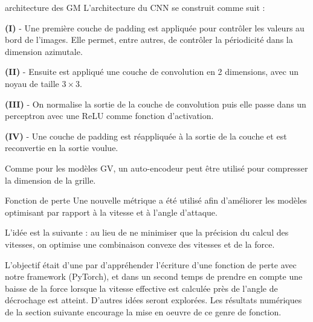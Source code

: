 \documentclass[
11pt,notheorems,hyperref={pdfauthor=whatever}
]{beamer}
\begin{document}
\begin{frame}{architecture des GM}
    L'architecture du CNN se construit comme suit : 
    
    \vspace{0.2cm}

    \textbf{(I)} - Une première couche de padding est appliquée pour contrôler les valeurs au bord de l'images. Elle permet, entre autres, de contrôler la périodicité dans la dimension azimutale.

    \vspace{0.2cm}

    \textbf{(II)} - Ensuite est appliqué une couche de convolution en 2 dimensions, avec un noyau de taille $3 \times 3$.

    \vspace{0.2cm}

    \textbf{(III)} - On normalise la sortie de la couche de convolution puis elle passe dans un perceptron avec une ReLU comme fonction d'activation.

    \vspace{0.2cm}

    \textbf{(IV)} - Une couche de padding est réappliquée à la sortie de la couche et est reconvertie en la sortie voulue.

    \vspace{0.3cm}

    Comme pour les modèles GV, un auto-encodeur peut être utilisé pour compresser la dimension de la grille.  
\end{frame}

\begin{frame}{Fonction de perte}
    Une nouvelle métrique a été utilisé afin d'améliorer les modèles optimisant
    par rapport à la vitesse et à l'angle d'attaque. 
    
    \vspace{0.2cm}

    L'idée est la suivante : au lieu de ne minimiser que la précision du calcul des vitesses, on optimise une combinaison convexe
    des vitesses et de la force. 
    
    \vspace{0.2cm}
    
    L'objectif était d'une par d'appréhender l'écriture d'une fonction de perte avec notre framework (PyTorch), et dans un second temps de prendre en compte une baisse de la force lorsque la vitesse effective est calculée près de l'angle de décrochage est atteint. D'autres idées seront explorées. 
    Les résultats numériques de la section suivante encourage la mise en oeuvre de ce genre de fonction. 
\end{frame}
\end{document}
